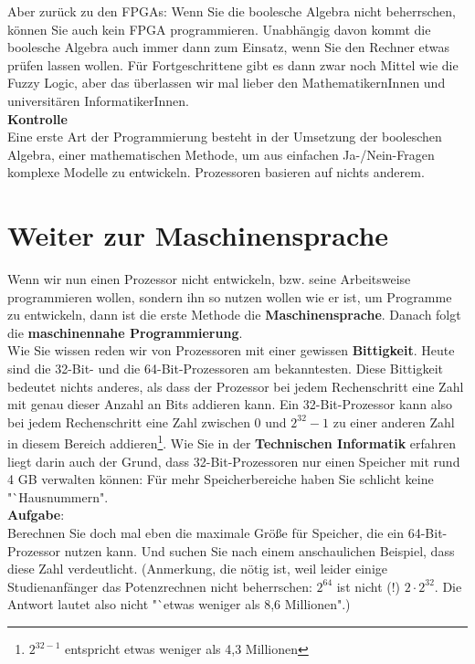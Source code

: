 Aber zurück zu den FPGAs: Wenn Sie die boolesche Algebra nicht beherrschen, können Sie auch kein FPGA programmieren. Unabhängig davon kommt die boolesche Algebra auch immer dann zum Einsatz, wenn Sie den Rechner etwas prüfen lassen wollen. Für Fortgeschrittene gibt es dann zwar noch Mittel wie die Fuzzy Logic, aber das überlassen wir mal lieber den MathematikernInnen und universitären InformatikerInnen.\\

\textbf{Kontrolle}\\
Eine erste Art der Programmierung besteht in der Umsetzung der booleschen Algebra, einer mathematischen Methode, um aus einfachen Ja-/Nein-Fragen komplexe Modelle zu entwickeln. Prozessoren basieren auf nichts anderem.

\section{Weiter zur Maschinensprache}

Wenn wir nun einen Prozessor nicht entwickeln, bzw. seine Arbeitsweise programmieren wollen, sondern ihn so nutzen wollen wie er ist, um Programme zu entwickeln, dann ist die erste Methode die \textbf{Maschinensprache}. Danach folgt die \textbf{maschinennahe Programmierung}.\\

Wie Sie wissen reden wir von Prozessoren mit einer gewissen \textbf{Bittigkeit}. Heute sind die 32-Bit- und die 64-Bit-Prozessoren am bekanntesten. Diese Bittigkeit bedeutet nichts anderes, als dass der Prozessor bei jedem Rechenschritt eine Zahl mit genau dieser Anzahl an Bits addieren kann. Ein 32-Bit-Prozessor kann also bei jedem Rechenschritt eine Zahl zwischen 0 und \(2^{32}-1\) zu einer anderen Zahl in diesem Bereich addieren\footnote{\(2^{32 - 1}\) entspricht etwas weniger als 4,3 Millionen}. Wie Sie in der \textbf{Technischen Informatik} erfahren liegt darin auch der Grund, dass 32-Bit-Prozessoren nur einen Speicher mit rund 4 GB verwalten können: Für mehr Speicherbereiche haben Sie schlicht keine "`Hausnummern".\\

\textbf{Aufgabe}:\\
Berechnen Sie doch mal eben die maximale Größe für Speicher, die ein 64-Bit-Prozessor nutzen kann. Und suchen Sie nach einem anschaulichen Beispiel, dass diese Zahl verdeutlicht. (Anmerkung, die nötig ist, weil leider einige Studienanfänger das Potenzrechnen nicht beherrschen: \(2^{64}\) ist nicht (!) \(2 \cdot 2^{32}\). Die Antwort lautet also nicht "`etwas weniger als 8,6 Millionen".)\\

